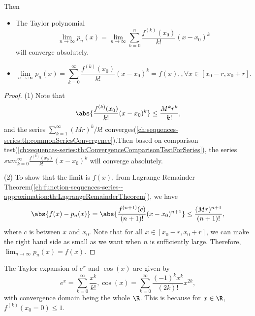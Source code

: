 \begin{refsection}
\begin{theorem}
	Then 
	\begin{itemize}
		\item The Taylor polynomial
		$$\lim_{n\to \infty}p_n(x) =\lim_{n\to \infty} \sum_{k=0}^n \frac{f^{(k)}(x_0)}{k!}(x-x_0)^k$$
		will converge absolutely.
		\item 
		$$\lim_{n\to\infty} p_n(x) =\sum_{k=0}^\infty \frac{f^{(k)}(x_0)}{k!}(x-x_0)^k = f(x),, \forall x\in [x_0-r,x_0+r].$$
	\end{itemize}
\end{theorem}
\begin{proof}
	(1)
	Note that
	$$\abs{\frac{f^{(k)}(x_0)}{k!}(x-x_0)^k} \leq \frac{M^kr^k}{k!},$$
	and the series $\sum_{k=1}^\infty (Mr)^k/k!$ converges(\autoref{ch:sequences-series:th:commonSeriesConvergence}).Then based on comparison test(\autoref{ch:sequences-series:th:ConvergenceComparisonTestForSeries}), the series $sum_{k=0}^\infty \frac{f^{(k)}(x_0)}{k!}(x-x_0)^k$	will converge absolutely.
	
	(2) To show that the limit is $f(x)$, from Lagrange Remainder Theorem(\autoref{ch:function-sequences-series--approximation:th:LagrangeRemainderTheorem}), we have
	$$\abs{f(x) - p_n(x)} = \abs{\frac{f^{(n+1)}(c)}{(n+1)!}(x-x_0)^{n+1}}\leq \frac{(Mr)^{n+1}}{(n+1)!} , $$
	where $c$ is between $x$ and $x_0$. Note that for all $ x\in [x_0-r,x_0+r]$, we can make the right hand side as small as we want when $n$ is sufficiently large. Therefore, $\lim_{n\to\infty} p_n(x) = f(x)$.
\end{proof}


\begin{example}
	The Taylor expansion of $e^x$ and $\cos(x)$ are given by
	$$e^x = \sum_{k=0}^\infty \frac{x^k}{k!}, \cos(x) = \sum_{k=0}^\infty \frac{(-1)^kx^k}{(2k)!}x^{2k},$$
	with convergence domain being the whole $\R$. This is because for $x\in \R$, $f^{(k)}(x_0 = 0) \leq 1$.	
\end{example}



\end{refsection}
